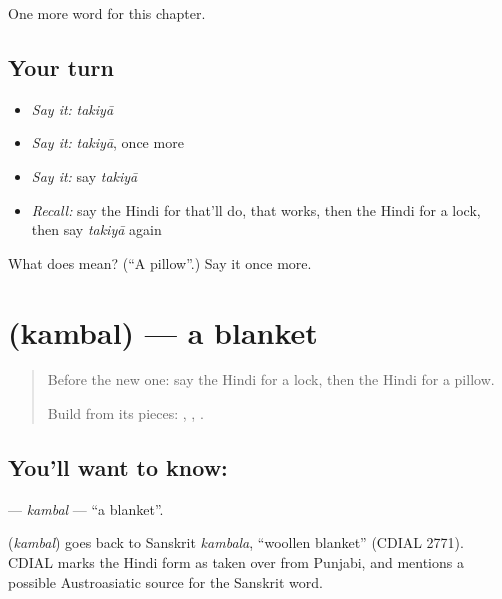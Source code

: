 \begin{grammarlens}[title={What you've built}]
One more word for this chapter.
\end{grammarlens}

\subsection*{Your turn}
\begin{itemize}
\raggedright
  \item \emph{Say it:} \emph{takiyā}
  \item \emph{Say it:} \emph{takiyā}, once more
  \item \emph{Say it:} say \emph{takiyā}
  \item \emph{Recall:} say the Hindi for that'll do, that works, then the Hindi for a lock, then say \emph{takiyā} again
\end{itemize}

\begin{tcolorbox}[breakable,colback=teal!4,colframe=teal!35!black,title={Before you move on}]
What does  mean? (\textquotedblleft{}A pillow\textquotedblright{}.) Say it once more.
\end{tcolorbox}
\section[\texorpdfstring{\hi{कंबल} (kambal)}{कंबल (kambal)}]{ (kambal) — a blanket}

\label{lesson:HI-C129-kambal}



\begin{quote}
Before the new one: say the Hindi for a lock, then the Hindi for a pillow.

Build \textbf{} from its pieces: \textbf{}, \textbf{}, \textbf{}.
\end{quote}

\subsection*{You'll want to know: }
\textbf{} — \emph{kambal} — \textquotedblleft{}a blanket\textquotedblright{}.

\begin{cousinweb}
\textbf{} (\emph{kambal}) goes back to Sanskrit \emph{kambala}, \textquotedblleft{}woollen blanket\textquotedblright{} (CDIAL 2771). CDIAL marks the Hindi form as taken over from Punjabi, and mentions a possible Austroasiatic source for the Sanskrit word.
\end{cousinweb}

